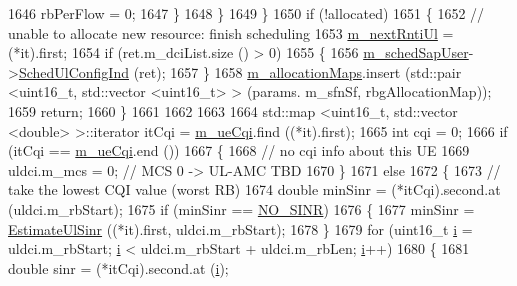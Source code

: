 \begin{DoxyCode}
1646                   rbPerFlow = 0;
1647                 \}
1648             \}
1649         \}
1650       \textcolor{keywordflow}{if} (!allocated)
1651         \{
1652           \textcolor{comment}{// unable to allocate new resource: finish scheduling}
1653           \hyperlink{classns3_1_1FdBetFfMacScheduler_ade4e2b997a835d6205e7275d58884c41}{m\_nextRntiUl} = (*it).first;
1654           \textcolor{keywordflow}{if} (ret.m\_dciList.size () > 0)
1655             \{
1656               \hyperlink{classns3_1_1FdBetFfMacScheduler_af2eac2234cc5c2b3d9999f9ec66911d3}{m\_schedSapUser}->\hyperlink{classns3_1_1FfMacSchedSapUser_a1b89636256701a84d990db7db8aea874}{SchedUlConfigInd} (ret);
1657             \}
1658           \hyperlink{classns3_1_1FdBetFfMacScheduler_a4263d235edb72f1e37dc659586eb0253}{m\_allocationMaps}.insert (std::pair <uint16\_t, std::vector <uint16\_t> > (params.
      m\_sfnSf, rbgAllocationMap));
1659           \textcolor{keywordflow}{return};
1660         \}
1661 
1662 
1663 
1664       std::map <uint16\_t, std::vector <double> >::iterator itCqi = \hyperlink{classns3_1_1FdBetFfMacScheduler_a8cb7a6ccbbc1ee0a6dd2872cdc9d131e}{m\_ueCqi}.find ((*it).first);
1665       \textcolor{keywordtype}{int} cqi = 0;
1666       \textcolor{keywordflow}{if} (itCqi == \hyperlink{classns3_1_1FdBetFfMacScheduler_a8cb7a6ccbbc1ee0a6dd2872cdc9d131e}{m\_ueCqi}.end ())
1667         \{
1668           \textcolor{comment}{// no cqi info about this UE}
1669           uldci.m\_mcs = 0; \textcolor{comment}{// MCS 0 -> UL-AMC TBD}
1670         \}
1671       \textcolor{keywordflow}{else}
1672         \{
1673           \textcolor{comment}{// take the lowest CQI value (worst RB)}
1674           \textcolor{keywordtype}{double} minSinr = (*itCqi).second.at (uldci.m\_rbStart);
1675           \textcolor{keywordflow}{if} (minSinr == \hyperlink{cqa-ff-mac-scheduler_8h_a520d71777be043568160c783a9c65fd5}{NO\_SINR})
1676             \{
1677               minSinr = \hyperlink{classns3_1_1FdBetFfMacScheduler_aba60aa765c817c48c8030c66aa642426}{EstimateUlSinr} ((*it).first, uldci.m\_rbStart);
1678             \}
1679           \textcolor{keywordflow}{for} (uint16\_t \hyperlink{bernuolliDistribution_8m_a6f6ccfcf58b31cb6412107d9d5281426}{i} = uldci.m\_rbStart; \hyperlink{bernuolliDistribution_8m_a6f6ccfcf58b31cb6412107d9d5281426}{i} < uldci.m\_rbStart + uldci.m\_rbLen; 
      \hyperlink{bernuolliDistribution_8m_a6f6ccfcf58b31cb6412107d9d5281426}{i}++)
1680             \{
1681               \textcolor{keywordtype}{double} sinr = (*itCqi).second.at (\hyperlink{bernuolliDistribution_8m_a6f6ccfcf58b31cb6412107d9d5281426}{i});

\end{DoxyCode}
